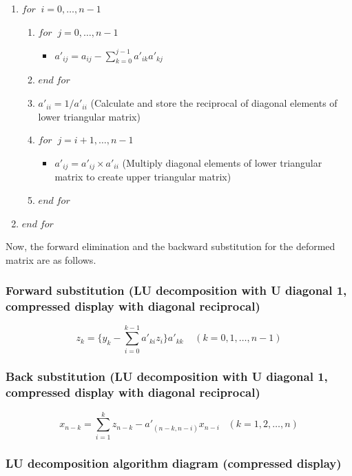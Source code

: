 \begin {enumerate}
\item $for\;\; i=0,\ldots,n-1$
\begin {enumerate}
\item $for\;\; j=0,\ldots,n-1$
\begin {itemize}
\item $a'_{ij} = a_{ij} - \sum_{k=0}^{j-1} a'_{ik} a'_{kj}$
\end {itemize}
\item $end\; for$
\item $a'_{ii} = 1/ a'_{ii}$ (Calculate and store the reciprocal of diagonal elements of lower triangular matrix)
\item $for\;\; j=i+1,\ldots,n-1$
\begin {itemize}
\item $a'_{ij} = a'_{ij}\times a'_{ii}$ (Multiply diagonal elements of lower triangular matrix to create upper triangular matrix)
\end {itemize}
\item $end\; for$
\end {enumerate}
\item $end\; for$
\end {enumerate}

Now, the forward elimination and the backward substitution for the deformed matrix are as follows.

\subsubsection{Forward substitution (LU decomposition with U diagonal 1, compressed display with diagonal reciprocal)}


\begin{equation}
z_k = \{y_k-\sum_{i=0}^{k-1}a'_{ki}z_i\}a'_{kk}\;\;\;\;(k=0,1,\ldots,n-1)
\end{equation}


\subsubsection{Back substitution (LU decomposition with U diagonal 1, compressed display with diagonal reciprocal)}


\begin{equation}
x_{n-k} = \sum_{i=1}^k z_{n-k}-a'_{(n-k,n-i)}x_{n-i}\;\;\;(k=1,2,\ldots,n)
\end{equation}


\subsubsection{LU decomposition algorithm diagram (compressed display)}

